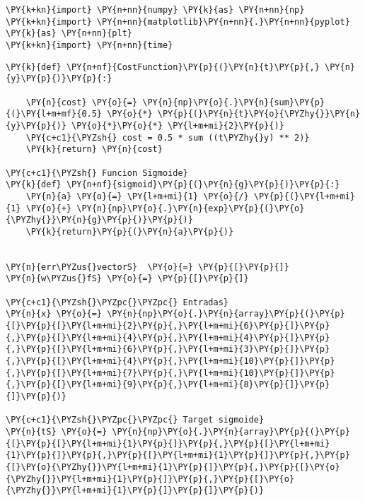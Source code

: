 \begin{tcolorbox}[breakable, size=fbox, boxrule=1pt, pad at break*=1mm,colback=cellbackground, colframe=cellborder]
\begin{Verbatim}[commandchars=\\\{\}]
\PY{k+kn}{import} \PY{n+nn}{numpy} \PY{k}{as} \PY{n+nn}{np}
\PY{k+kn}{import} \PY{n+nn}{matplotlib}\PY{n+nn}{.}\PY{n+nn}{pyplot} \PY{k}{as} \PY{n+nn}{plt}
\PY{k+kn}{import} \PY{n+nn}{time}
\end{Verbatim}
\end{tcolorbox}

    \begin{tcolorbox}[breakable, size=fbox, boxrule=1pt, pad at break*=1mm,colback=cellbackground, colframe=cellborder]
\begin{Verbatim}[commandchars=\\\{\}]
\PY{k}{def} \PY{n+nf}{CostFunction}\PY{p}{(}\PY{n}{t}\PY{p}{,} \PY{n}{y}\PY{p}{)}\PY{p}{:}
    
    \PY{n}{cost} \PY{o}{=} \PY{n}{np}\PY{o}{.}\PY{n}{sum}\PY{p}{(}\PY{l+m+mf}{0.5} \PY{o}{*} \PY{p}{(}\PY{n}{t}\PY{o}{\PYZhy{}}\PY{n}{y}\PY{p}{)} \PY{o}{*}\PY{o}{*} \PY{l+m+mi}{2}\PY{p}{)}
    \PY{c+c1}{\PYZsh{} cost = 0.5 * sum ((t\PYZhy{}y) ** 2)}
    \PY{k}{return} \PY{n}{cost}

\PY{c+c1}{\PYZsh{} Funcion Sigmoide}
\PY{k}{def} \PY{n+nf}{sigmoid}\PY{p}{(}\PY{n}{g}\PY{p}{)}\PY{p}{:}
    \PY{n}{a} \PY{o}{=} \PY{l+m+mi}{1} \PY{o}{/} \PY{p}{(}\PY{l+m+mi}{1} \PY{o}{+} \PY{n}{np}\PY{o}{.}\PY{n}{exp}\PY{p}{(}\PY{o}{\PYZhy{}}\PY{n}{g}\PY{p}{)}\PY{p}{)}
    \PY{k}{return}\PY{p}{(}\PY{n}{a}\PY{p}{)}


\PY{n}{err\PYZus{}vectorS}  \PY{o}{=} \PY{p}{[}\PY{p}{]}
\PY{n}{w\PYZus{}fS} \PY{o}{=} \PY{p}{[}\PY{p}{]}

\PY{c+c1}{\PYZsh{}\PYZpc{}\PYZpc{} Entradas}
\PY{n}{x} \PY{o}{=} \PY{n}{np}\PY{o}{.}\PY{n}{array}\PY{p}{(}\PY{p}{[}\PY{p}{[}\PY{l+m+mi}{2}\PY{p}{,}\PY{l+m+mi}{6}\PY{p}{]}\PY{p}{,}\PY{p}{[}\PY{l+m+mi}{4}\PY{p}{,}\PY{l+m+mi}{4}\PY{p}{]}\PY{p}{,}\PY{p}{[}\PY{l+m+mi}{6}\PY{p}{,}\PY{l+m+mi}{3}\PY{p}{]}\PY{p}{,}\PY{p}{[}\PY{l+m+mi}{4}\PY{p}{,}\PY{l+m+mi}{10}\PY{p}{]}\PY{p}{,}\PY{p}{[}\PY{l+m+mi}{7}\PY{p}{,}\PY{l+m+mi}{10}\PY{p}{]}\PY{p}{,}\PY{p}{[}\PY{l+m+mi}{9}\PY{p}{,}\PY{l+m+mi}{8}\PY{p}{]}\PY{p}{]}\PY{p}{)}

\PY{c+c1}{\PYZsh{}\PYZpc{}\PYZpc{} Target sigmoide}
\PY{n}{tS} \PY{o}{=} \PY{n}{np}\PY{o}{.}\PY{n}{array}\PY{p}{(}\PY{p}{[}\PY{p}{[}\PY{l+m+mi}{1}\PY{p}{]}\PY{p}{,}\PY{p}{[}\PY{l+m+mi}{1}\PY{p}{]}\PY{p}{,}\PY{p}{[}\PY{l+m+mi}{1}\PY{p}{]}\PY{p}{,}\PY{p}{[}\PY{o}{\PYZhy{}}\PY{l+m+mi}{1}\PY{p}{]}\PY{p}{,}\PY{p}{[}\PY{o}{\PYZhy{}}\PY{l+m+mi}{1}\PY{p}{]}\PY{p}{,}\PY{p}{[}\PY{o}{\PYZhy{}}\PY{l+m+mi}{1}\PY{p}{]}\PY{p}{]}\PY{p}{)}


\end{Verbatim}
\end{tcolorbox}
